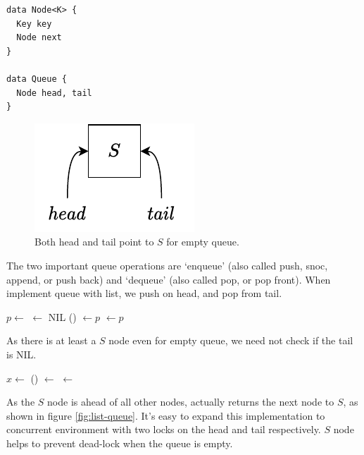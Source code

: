 \documentclass[b5paper]{article}
\begin{document}
\lstset{frame = single}
\begin{lstlisting}[language = Bourbaki]
data Node<K> {
  Key key
  Node next
}

data Queue {
  Node head, tail
}
\end{lstlisting}

\begin{figure}[htbp]
  \centering
  \includegraphics[scale=0.6]{img/empty-list}
  \caption{Both head and tail point to $S$ for empty queue.}
  \label{fig:empty-list}
\end{figure}

The two important queue operations are `enqueue' (also called push, snoc, append, or push back) and `dequeue' (also called pop, or pop front). When implement queue with list, we push on head, and pop from tail.

\begin{algorithmic}[1]
  \State $p \gets $ 
  \State {} $\gets$ NIL
  \State {}() $\gets p$
  \State {} $\gets p$
\EndFunction
\end{algorithmic}

As there is at least a $S$ node even for empty queue, we need not check if the tail is NIL.

\begin{algorithmic}[1]
  \State $x \gets $ 
  \State {}() $\gets$ 
   
    \State {} $\gets$ 
  \EndIf
  \State \Return {}
\EndFunction
\end{algorithmic}

As the $S$ node is ahead of all other nodes,  actually returns the next node to $S$, as shown in figure \cref{fig:list-queue}. It's easy to expand this implementation to concurrent environment with two locks on the head and tail respectively. $S$ node helps to prevent dead-lock when the queue is empty\cite{PODC96}\cite{SutterDDJ}.
\end{document}
